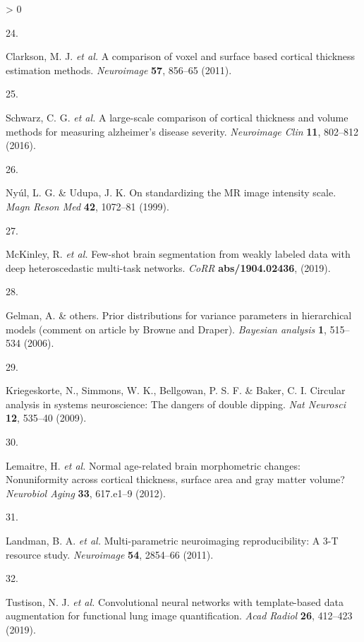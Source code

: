 \documentclass[
  12pt,
]{article}
\newlength{\cslhangindent}
\newlength{\csllabelwidth}
\newenvironment{CSLReferences}[3] %
 {%
  \setlength{\parindent}{0pt}
  \ifodd #1 \everypar{\setlength{\hangindent}{\cslhangindent}}\ignorespaces\fi
  \ifnum #2 > 0
  \setlength{\parskip}{#3\baselineskip}
  \fi
 }%
 {}
\newcommand{\CSLLeftMargin}[1]{\parbox[t]{\maxof{\widthof{#1}}{\csllabelwidth}}{#1}}
\newcommand{\CSLRightInline}[1]{\parbox[t]{\linewidth}{#1}}
\begin{document}
\begin{CSLReferences}{0}{0}
\leavevmode\hypertarget{ref-Clarkson:2011aa}{}%
\CSLLeftMargin{24. }
\CSLRightInline{Clarkson, M. J. \emph{et al.} A comparison of voxel and
surface based cortical thickness estimation methods. \emph{Neuroimage}
\textbf{57}, 856--65 (2011).}

\leavevmode\hypertarget{ref-Schwarz:2016aa}{}%
\CSLLeftMargin{25. }
\CSLRightInline{Schwarz, C. G. \emph{et al.} A large-scale comparison of
cortical thickness and volume methods for measuring alzheimer's disease
severity. \emph{Neuroimage Clin} \textbf{11}, 802--812 (2016).}

\leavevmode\hypertarget{ref-Nyul:1999aa}{}%
\CSLLeftMargin{26. }
\CSLRightInline{Nyúl, L. G. \& Udupa, J. K. On standardizing the {MR}
image intensity scale. \emph{Magn Reson Med} \textbf{42}, 1072--81
(1999).}

\leavevmode\hypertarget{ref-deepscan}{}%
\CSLLeftMargin{27. }
\CSLRightInline{McKinley, R. \emph{et al.} Few-shot brain segmentation
from weakly labeled data with deep heteroscedastic multi-task networks.
\emph{CoRR} \textbf{abs/1904.02436}, (2019).}

\leavevmode\hypertarget{ref-gelman2006prior}{}%
\CSLLeftMargin{28. }
\CSLRightInline{Gelman, A. \& others. Prior distributions for variance
parameters in hierarchical models (comment on article by {B}rowne and
{D}raper). \emph{Bayesian analysis} \textbf{1}, 515--534 (2006).}

\leavevmode\hypertarget{ref-Kriegeskorte:2009aa}{}%
\CSLLeftMargin{29. }
\CSLRightInline{Kriegeskorte, N., Simmons, W. K., Bellgowan, P. S. F. \&
Baker, C. I. Circular analysis in systems neuroscience: The dangers of
double dipping. \emph{Nat Neurosci} \textbf{12}, 535--40 (2009).}

\leavevmode\hypertarget{ref-Lemaitre:2012aa}{}%
\CSLLeftMargin{30. }
\CSLRightInline{Lemaitre, H. \emph{et al.} Normal age-related brain
morphometric changes: Nonuniformity across cortical thickness, surface
area and gray matter volume? \emph{Neurobiol Aging} \textbf{33},
617.e1--9 (2012).}

\leavevmode\hypertarget{ref-Landman:2011aa}{}%
\CSLLeftMargin{31. }
\CSLRightInline{Landman, B. A. \emph{et al.} Multi-parametric
neuroimaging reproducibility: A {3-T} resource study. \emph{Neuroimage}
\textbf{54}, 2854--66 (2011).}

\leavevmode\hypertarget{ref-Tustison:2019ac}{}%
\CSLLeftMargin{32. }
\CSLRightInline{Tustison, N. J. \emph{et al.} Convolutional neural
networks with template-based data augmentation for functional lung image
quantification. \emph{Acad Radiol} \textbf{26}, 412--423 (2019).}


\end{CSLReferences}
\end{document}
